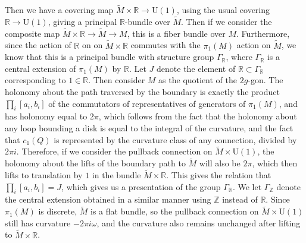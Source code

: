 \documentclass[psamsfonts, 12pt]{amsart}
\theoremstyle{definition}
\theoremstyle{remark}
\newcommand{\R}{\mathbb{R}}
\newcommand{\Z}{\mathbb{Z}}
\begin{document}
%
Then we have a covering map $\widetilde{M} \times \R \to \mathrm{U}(1)$, using the usual
covering $\R \to \mathrm{U}(1)$, giving a principal $\R$-bundle over $\widetilde{M}$.
Then if we consider the composite map $\widetilde{M} \times \R \to \widetilde{M} \to M$,
this is a fiber bundle over $M$. Furthermore, since the action of $\R$
on on $\widetilde{M} \times \R$ commutes with the $\pi_1(M)$ action on $\widetilde{M}$,
we know that this is a principal bundle with structure group $\Gamma_\R$, where
$\Gamma_\R$ is a central extension of $\pi_1(M)$ by $\R$. Let $J$ denote the
element of $\R \subset \Gamma_\R$ corresponding to $1 \in \R$. Then consider
$M$ as the quotient of the $2g$-gon. The holonomy about the path traversed by
the boundary is exactly the product $\prod_i [a_i,b_i]$ of the commutators of
representatives of generators of $\pi_1(M)$, and has holonomy equal to $2\pi$, which
follows from the fact that the holonomy about any loop bounding a disk is equal to the
integral of the curvature, and the fact that $c_1(Q)$ is represented by
the curvature class of any connection, divided by $2\pi i$. Therefore, if we
consider the pullback connection on $\widetilde{M} \times \mathrm{U}(1)$, the holonomy
about the lifts of the boundary path to $\widetilde{M}$ will also be $2\pi$,
which then lifts to translation by $1$ in the bundle $\widetilde{M} \times \R$.
This gives the relation that $\prod_i [a_i,b_i] = J$, which gives us a presentation
of the group $\Gamma_\R$. We let $\Gamma_\Z$ denote the central extension obtained
in a similar manner using $\Z$ instead of $\R$. Since $\pi_1(M)$ is discrete,
$\widetilde{M}$ is a flat bundle, so the pullback connection on
$\widetilde{M} \times \mathrm{U}(1)$ still has curvature $-2\pi i \omega$, and the
curvature also remains unchanged after lifting to $\widetilde{M} \times \R$. \\
\end{document}
